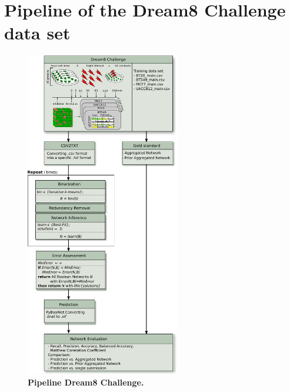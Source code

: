 \section{Pipeline of the Dream8 Challenge data set}
\begin{figure}[H]
\centering\includegraphics[width=0.6\textwidth]{./Bilder/pipeline_dream8.pdf}
\caption[pipelineDream8]{\textbf{Pipeline Dream8 Challenge. }}
\label{fig:9}
\end{figure}




